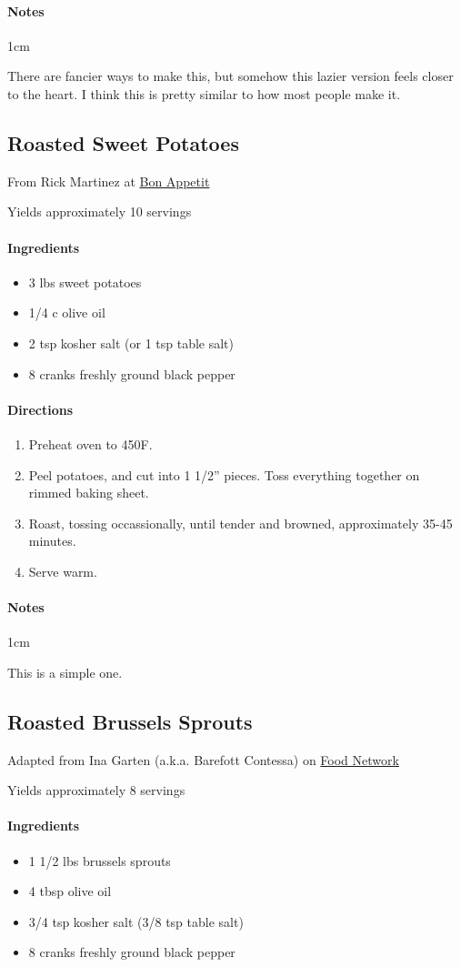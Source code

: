 \documentclass[12pt]{article}
\newenvironment*{ingredients}
	{
		\paragraph*{Ingredients}
		\begin{itemize}
	}
	{
		\end{itemize}
	}
\newenvironment*{directions}
	{
		\paragraph*{Directions}
		\begin{enumerate}
	}
	{
		\end{enumerate}
	}
\newenvironment*{notes}
	{
		\paragraph*{Notes}
		\begin{adjustwidth}{1cm}{}
	}
	{
		\end{adjustwidth}
	}
\begin{document}
	\begin{notes}
		There are fancier ways to make this, but somehow this lazier version feels closer to the heart. I think this is pretty similar to how most people make it.
	\end{notes}
	
	\newpage
	
	\subsection{Roasted Sweet Potatoes}
	From Rick Martinez at \href{https://www.bonappetit.com/recipe/roasted-sweet-potatoes}{Bon Appetit}
	
	Yields approximately 10 servings
	
	\begin{ingredients}
		\item 3 lbs sweet potatoes
		\item 1/4 c olive oil
		\item 2 tsp kosher salt (or 1 tsp table salt)
		\item 8 cranks freshly ground black pepper
	\end{ingredients}
	
	\begin{directions}
		\item Preheat oven to 450F.
		\item Peel potatoes, and cut into 1 1/2” pieces. Toss everything together on rimmed baking sheet.
		\item Roast, tossing occassionally, until tender and browned, approximately 35-45 minutes.
		\item Serve warm.
	\end{directions}
	
	\begin{notes}
		This is a simple one.
	\end{notes}
	
	\newpage
	
	\subsection{Roasted Brussels Sprouts}
	Adapted from Ina Garten (a.k.a. Barefott Contessa) on \href{https://www.foodnetwork.com/recipes/ina-garten/roasted-brussels-sprouts-recipe2-1941953#reviewsTop}{Food Network}
	
	Yields approximately 8 servings
	
	\begin{ingredients}
		\item 1 1/2 lbs brussels sprouts
		\item 4 tbsp olive oil
		\item 3/4 tsp kosher salt (3/8 tsp table salt)
		\item 8 cranks freshly ground black pepper
	\end{ingredients}
	
\end{document}
